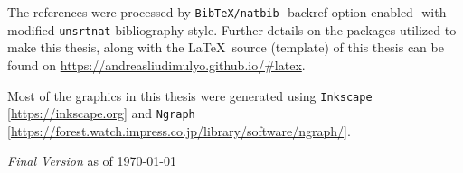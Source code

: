 {\noindent The references were processed by \texttt{BibTeX/natbib} -backref option enabled- with modified \texttt{unsrtnat} bibliography style. Further details on the packages utilized to make this thesis, along with the \LaTeX \ source (template) of this thesis can be found on \url{https://andreasliudimulyo.github.io/#latex}. \\

\begin{sloppypar}
\noindent Most of the graphics in this thesis were generated using \texttt{Inkscape} [\url{https://inkscape.org}] and \texttt{Ngraph} [\url{https://forest.watch.impress.co.jp/library/software/ngraph/}].
\end{sloppypar}

\vspace{4mm}

\noindent\emph{Final Version} as of \today%
}